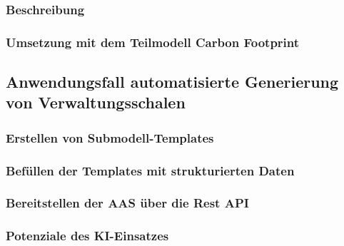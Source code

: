 \subsubsection{Beschreibung}
\subsubsection{Umsetzung mit dem Teilmodell Carbon Footprint}
\subsection{Anwendungsfall automatisierte Generierung von Verwaltungsschalen}
\subsubsection{Erstellen von Submodell-Templates}
\subsubsection{Befüllen der Templates mit strukturierten Daten}
\subsubsection{Bereitstellen der AAS über die Rest API}
\subsubsection{Potenziale des KI-Einsatzes}